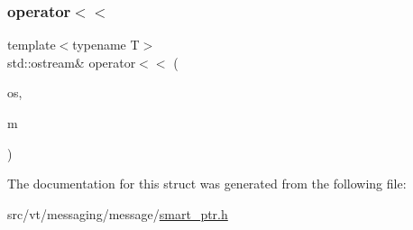 \subsubsection{\texorpdfstring{operator$<$$<$}{operator<<}}
{\footnotesize\ttfamily template$<$typename T$>$ \\
std\+::ostream\& operator$<$$<$ (\begin{DoxyParamCaption}\item[{std\+::ostream \&}]{os,  }\item[{\hyperlink{structvt_1_1messaging_1_1_msg_shared_ptr}{Msg\+Shared\+Ptr}$<$ T $>$ const \&}]{m }\end{DoxyParamCaption})\hspace{0.3cm}{\ttfamily [friend]}}



The documentation for this struct was generated from the following file\+:\begin{DoxyCompactItemize}
\item 
src/vt/messaging/message/\hyperlink{smart__ptr_8h}{smart\+\_\+ptr.\+h}\end{DoxyCompactItemize}
